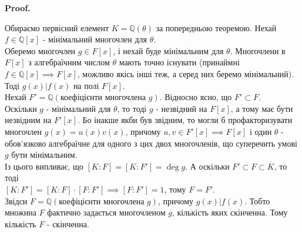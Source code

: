 \documentclass[a4paper, 10pt]{article}
\makeatletter
\theoremstyle{theoremdd}
\theoremstyle{theoremdd}
\theoremstyle{theoremdd}
\theoremstyle{theoremdd}
\theoremstyle{theoremdd}
\theoremstyle{theoremdd}
\theoremstyle{theoremdd}
\theoremstyle{theoremdd}
\renewenvironment{proof}[1][Proof.\\]{\par
\pushQED{\hfill \qed}%
\normalfont \topsep6\p@\@plus6\p@\relax
\trivlist
\item\relax
{\bfseries
#1\@addpunct{.}}\hspace\labelsep\ignorespaces
}{%
\popQED\endtrivlist\@endpefalse
}
\makeatother
\begin{document}
\begin{proof}
Обираємо первісний елемент $K = \mathbb{Q}(\theta)$ за попередньою теоремою. Нехай $f \in \mathbb{Q}[x]$ - мінімальний многочлен для $\theta$.\\
Оберемо многочлен $g \in F[x]$, і нехай буде мінімальним для $\theta$. Многочлени в $F[x]$ з алгебраїчним числом $\theta$ мають точно існувати (принаймні $f \in \mathbb{Q}[x] \implies F[x]$, можливо якісь інші теж, а серед них беремо мінімальний).\\
Тоді $g(x) | f(x)$ на полі $F[x]$.\\
Нехай $F' = \mathbb{Q}(\text{коефіцієнти многочлена }g)$. Відносно ясно, що $F' \subset F$.\\
Оскільки $g$ - мінімальний для $\theta$, то тоді $g$ - незвідний на $F[x]$, а тому має бути незвідним на $F'[x]$. Бо інакше якби був звідним, то могли б профакторизувати многочлен $g(x) = u(x)v(x)$, причому $u,v \in F'[x] \implies F[x]$ і один $\theta$ - обов'язково алгебраїчне для одного з цих двох многочленів, що суперечить умові $g$ бути мінімальним.\\

Із цього випливає, що $[K:F] = [K:F'] = \deg g$. А оскільки $F' \subset F \subset K$, то тоді\\
$[K:F'] = [K:F] \cdot [F:F'] \implies [F:F'] = 1$, тому $F = F'$.\\
Звідси $F = \mathbb{Q}(\text{коефіцієнти многочлена }g)$, причому $g(x) | f(x)$. Тобто множина $F$ фактично задається многочленом $g$, кількість яких скінченна. Тому кількість $F$ - скінченна.
\end{proof}
\end{document}
